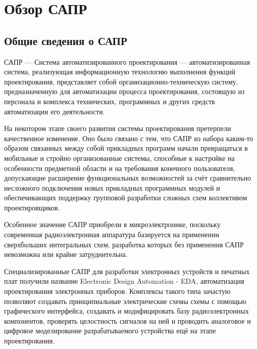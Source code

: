\section{Обзор САПР}
\subsection{Общие сведения о САПР}
\begin{par}
САПР --- Система автоматизированного проектирования --- автоматизированная система, реализующая
информационную технологию выполнения функций проектирования, представляет собой
организационно-техническую систему, предназначенную для автоматизации процесса проектирования,
состоящую из персонала и комплекса технических, программных и других средств
автоматизации его деятельности.
\end{par}

\begin{par}
На некотором этапе своего развития системы проектирования претерпели качественное изменение.
Оно было связано с тем, что САПР из набора каким-то образом связанных между собой прикладных
программ начали превращаться в мобильные и стройно организованные системы, способные к
настройке на особенности предметной области и на требования конечного пользователя,
допускающие расширение функциональных возможностей за счёт сравнительно несложного подключения
новых прикладных программных модулей и обеспечивающих поддержку групповой разработки сложных схем
коллективом проектировщиков.
\end{par}

\begin{par}
Особенное значение САПР приобрели в микроэлектронике, поскольку современная радиоэлектронная аппаратура базируется на применении сверхбольших интегральных схем, разработка которых без применения САПР невозможна или крайне затруднительна.
\end{par}

\begin{par}
Специализированные САПР для разработки электронных устройств и печатных плат получили название
Electronic Design Automation - EDA, автоматизация проектирования электронных приборов.
Комплексы такого типа зачастую позволяют создавать принципиальные электрические схемы схемы с
помощью графического интерфейса, создавать и модифицировать  базу радиоэлектронных компонентов,
проверять целостность сигналов на ней и проводить аналоговое и цифровое моделирование
разрабатываемого устройства ещё на этапе проектирования.
\end{par}


